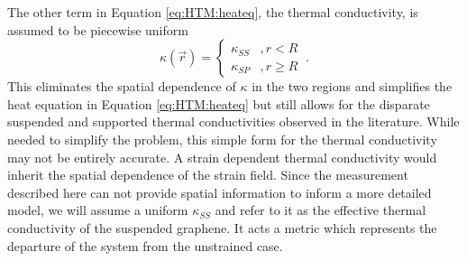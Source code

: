 The other term in Equation \ref{eq:HTM:heateq}, the thermal conductivity, is assumed to be piecewise uniform
\begin{equation*}
	\kappa (\vec{r})=\left \{ \begin{array}{ll} \kappa_{SS} & , r<R \\ \kappa_{SP} & , r \geq R \end{array} \right. \ .
\end{equation*}
This eliminates the spatial dependence of $\kappa$ in the two regions and simplifies the heat equation in Equation \ref{eq:HTM:heateq} but still allows for the disparate suspended and supported thermal conductivities observed in the literature.
While needed to simplify the problem, this simple form for the thermal conductivity may not be entirely accurate. 
A strain dependent thermal conductivity would inherit the spatial dependence of the strain field.
Since the measurement described here can not provide spatial information to inform a more detailed model, we will assume a uniform $\kappa_{SS}$ and refer to it as the effective thermal conductivity of the suspended graphene.
It acts a metric which represents the departure of the system from the unstrained case.

